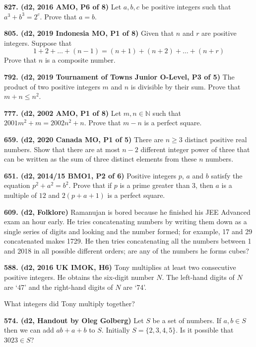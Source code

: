 \documentclass{article}
\begin{document}
\textbf{827. (\color{red}d2\color{black}, 2016 AMO, P6 of 8)} Let $a, b, c$ be positive integers such that $a^{3}+b^{3}=2^{c}$.
\smallbreak
Prove that $a=b$.

\textbf{805. (\color{red}d2\color{black}, 2019 Indonesia MO, P1 of 8)} Given that $n$ and $r$ are positive integers. Suppose that $$ 1 + 2 + \dots + (n - 1) = (n + 1) + (n + 2) + \dots + (n + r) $$ Prove that $n$ is a composite number.

\textbf{792. (\color{red}d2\color{black}, 2019 Tournament of Towns Junior O-Level, P3 of 5)} The product of two positive integers $m$ and $n$ is divisible by their sum. Prove that $m + n \le  n^2$.

\textbf{777. (\color{red}d2\color{black}, 2002 AMO, P1 of 8)} Let $m, n \in \mathbb{N}$ such that $2001 m^{2}+m=2002 n^{2}+n$.
Prove that $m-n$ is a perfect square.

\textbf{659. (\color{red}d2\color{black}, 2020 Canada MO, P1 of 5)} There are $n \ge 3$ distinct positive real numbers. Show that there are at most $n-2$ different integer power of three that can be written as the sum of three distinct elements from these $n$ numbers.

\textbf{651. (\color{red}d2\color{black}, 2014/15 BMO1, P2 of 6)} Positive integers $p$, $a$ and $b$ satisfy the equation $p^2+a^2=b^2$. Prove that if $p$ is a prime greater than $3$, then $a$ is a multiple of $12$ and $2(p+a+1)$ is a perfect square.

\textbf{609. (\color{red}d2\color{black}, Folklore)} Ramanujan is bored because he finished his JEE Advanced exam an hour early. He tries concatenating numbers by writing them down as a single series of digits and looking and the number formed; for example, 17 and 29 concatenated makes 1729. He then tries concatenating all the numbers between 1 and 2018 in all possible different orders; are any of the numbers he forms cubes?

\textbf{588. (\color{red}d2\color{black}, 2016 UK IMOK, H6)} Tony multiplies at least two consecutive positive integers. He obtains the six-digit number $N$. The left-hand digits of $N$ are `47' and the right-hand digits of $N$ are `74'.

What integers did Tony multiply together?

\textbf{574. (\color{red}d2\color{black}, Handout by Oleg Golberg)} Let $S$ be a set of numbers. If $a,b\in S$ then we can add $ab+a+b$ to $S$. Initially $S=\{2,3,4,5\}$. Is it possible that $3023\in S$?
\end{document}
